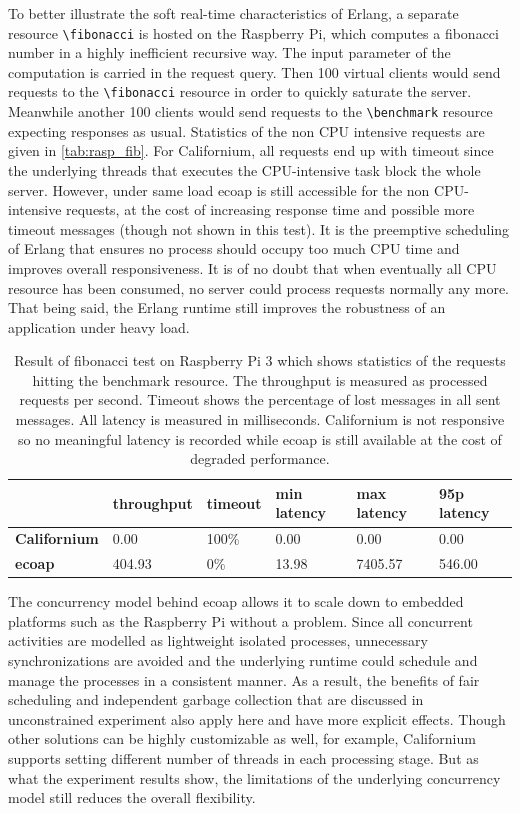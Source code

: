 To better illustrate the soft real-time characteristics of Erlang, a separate resource \verb|\fibonacci| is hosted on the Raspberry Pi, which computes a fibonacci number in a highly inefficient recursive way. The input parameter of the computation is carried in the request query. Then 100 virtual clients would send requests to the \verb|\fibonacci| resource in order to quickly saturate the server. Meanwhile another 100 clients would send requests to the \verb|\benchmark| resource expecting responses as usual. Statistics of the non CPU intensive requests are given in \autoref{tab:rasp_fib}. For Californium, all requests end up with timeout since the underlying threads that executes the CPU-intensive task block the whole server. However, under same load ecoap is still accessible for the non CPU-intensive requests, at the cost of increasing response time and possible more timeout messages (though not shown in this test). It is the preemptive scheduling of Erlang that ensures no process should occupy too much CPU time and improves overall responsiveness. It is of no doubt that when eventually all CPU resource has been consumed, no server could process requests normally any more. That being said, the Erlang runtime still improves the robustness of an application under heavy load.

\begin{table}[!htbp]
\centering
\begin{tabular}{llllll}
%
 & \bfseries throughput &  \bfseries timeout & \bfseries min latency & \bfseries max latency & \bfseries 95p latency \\\hline
\bfseries Californium & 0.00 & 100\% & 0.00 & 0.00 & 0.00 \\\hline
\bfseries ecoap & 404.93 & 0\% & 13.98 & 7405.57 & 546.00\\
\end{tabular}
\caption[Result of fibonacci test on Raspberry Pi 3]{Result of fibonacci test on Raspberry Pi 3 which shows statistics of the requests hitting the benchmark resource. The throughput is measured as processed requests per second. Timeout shows the percentage of lost messages in all sent messages. All latency is measured in milliseconds. Californium is not responsive so no meaningful latency is recorded while ecoap is still available at the cost of degraded performance.}
\label{tab:rasp_fib}
\end{table}

The concurrency model behind ecoap allows it to scale down to embedded platforms such as the Raspberry Pi without a problem. Since all concurrent activities are modelled as lightweight isolated processes, unnecessary synchronizations are avoided and the underlying runtime could schedule and manage the processes in a consistent manner. As a result, the benefits of fair scheduling and independent garbage collection that are discussed in unconstrained experiment also apply here and have more explicit effects. Though other solutions can be highly customizable as well, for example, Californium supports setting different number of threads in each processing stage. But as what the experiment results show, the limitations of the underlying concurrency model still reduces the overall flexibility. 

